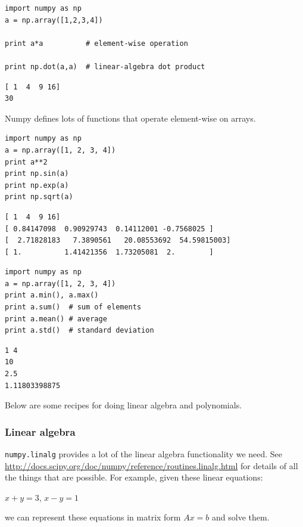 \documentclass[11pt]{article}
\begin{document}
\begin{verbatim}
import numpy as np
a = np.array([1,2,3,4])

print a*a          # element-wise operation

print np.dot(a,a)  # linear-algebra dot product
\end{verbatim}

\begin{verbatim}
[ 1  4  9 16]
30
\end{verbatim}

Numpy defines lots of functions that operate element-wise on arrays.

\begin{verbatim}
import numpy as np
a = np.array([1, 2, 3, 4])
print a**2
print np.sin(a)
print np.exp(a)
print np.sqrt(a)
\end{verbatim}

\begin{verbatim}
[ 1  4  9 16]
[ 0.84147098  0.90929743  0.14112001 -0.7568025 ]
[  2.71828183   7.3890561   20.08553692  54.59815003]
[ 1.          1.41421356  1.73205081  2.        ]
\end{verbatim}

\begin{verbatim}
import numpy as np
a = np.array([1, 2, 3, 4])
print a.min(), a.max()
print a.sum()  # sum of elements
print a.mean() # average
print a.std()  # standard deviation
\end{verbatim}

\begin{verbatim}
1 4
10
2.5
1.11803398875
\end{verbatim}


Below are some recipes for doing linear algebra and polynomials.


\subsubsection{Linear algebra}
\label{sec-3-9-2}
\texttt{numpy.linalg} provides a lot of the linear algebra functionality we need. See \url{http://docs.scipy.org/doc/numpy/reference/routines.linalg.html} for details of all the things that are possible. For example, given these linear equations:

$x + y = 3$, 
$x - y = 1$

we can represent these equations in matrix form $A x = b$ and solve them.
\end{document}
